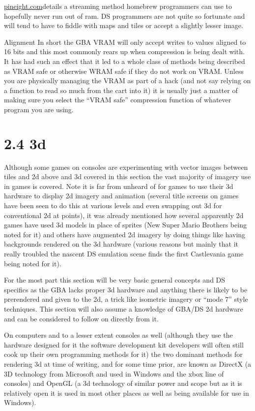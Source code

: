 \documentclass[
]{book}
\begin{document}
\href{http://pineight.com/gba/managing-sprite-vram.txt}{pineight.com}details a streaming method homebrew programmers can use to hopefully never run out of ram. DS programmers are not quite so fortunate and will tend to have to fiddle with maps and tiles or accept a slightly lesser image.

Alignment In short the GBA VRAM will only accept writes to values aligned to 16 bits and this most commonly rears up when compression is being dealt with. It has had such an effect that it led to a whole class of methods being described as VRAM safe or otherwise WRAM safe if they do not work on VRAM. Unless you are physically managing the VRAM as part of a hack (and not say relying on a function to read so much from the cart into it) it is usually just a matter of making sure you select the ``VRAM safe'' compression function of whatever program you are using.

\hypertarget{d}{%
\section{2.4 3d}\label{d}}

Although some games on consoles are experimenting with vector images between tiles and 2d above and 3d covered in this section the vast majority of imagery use in games is covered. Note it is far from unheard of for games to use their 3d hardware to display 2d imagery and animation (several title screens on games have been seen to do this at various levels and even swapping out 3d for conventional 2d at points), it was already mentioned how several apparently 2d games have used 3d models in place of sprites (New Super Mario Brothers being noted for it) and others have augmented 2d imagery by doing things like having backgrounds rendered on the 3d hardware (various reasons but mainly that it really troubled the nascent DS emulation scene finds the first Castlevania game being noted for it).

For the most part this section will be very basic general concepts and DS specifics as the GBA lacks proper 3d hardware and anything there is likely to be prerendered and given to the 2d, a trick like isometric imagery or ``mode 7'' style techniques. This section will also assume a knowledge of GBA/DS 2d hardware and can be considered to follow on directly from it.

On computers and to a lesser extent consoles as well (although they use the hardware designed for it the software development kit developers will often still cook up their own programming methods for it) the two dominant methods for rendering 3d at time of writing, and for some time prior, are known as DirectX (a 3D technology from Microsoft and used in Windows and the xbox line of consoles) and OpenGL (a 3d technology of similar power and scope but as it is relatively open it is used in most other places as well as being available for use in Windows).
\end{document}
